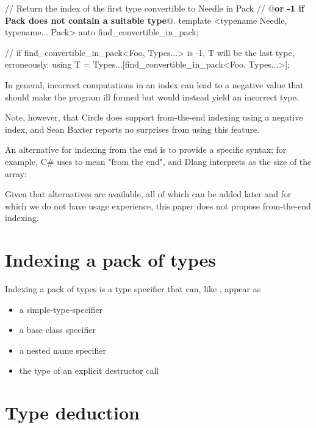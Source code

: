 \documentclass{wg21}
\begin{document}
\begin{colorblock}
// Return the index of the first type convertible to Needle in Pack
// @\textbf{or -1 if Pack does not contain a suitable type}@.
template <typename Needle, typename... Pack>
auto find_convertible_in_pack;

// if find_convertible_in_pack<Foo, Types...> is -1, T will be the last type, erroneously.
using T = Types...[find_convertible_in_pack<Foo, Types...>];
\end{colorblock}

In general, incorrect computations in an index can lead to a negative value that should make the program ill formed but would instead
yield an incorrect type.

Note, however, that Circle does support from-the-end indexing using a negative index, and Sean Baxter reports no surprises from using this feature.

An alternative for indexing from the end is to provide a specific syntax; for example, C\# uses \tcode{\^{}} to mean "from the end", and Dlang interprets \tcode{\${}}
as the size of the array:

Given that alternatives are available, all of which can be added later and for which we do not have usage experience, this paper does not propose
from-the-end indexing.

\section{Indexing a pack of types}

Indexing a pack of types is a type specifier that can, like , appear as
\begin{itemize}
    \item a simple-type-specifier
    \item a base class specifier
    \item a nested name specifier
    \item the type of an explicit destructor call
\end{itemize}

\section{Type deduction}
\end{document}
